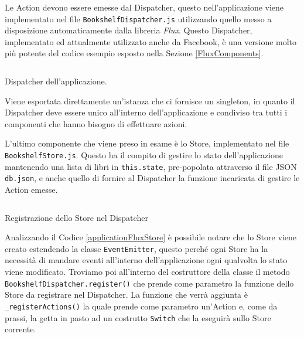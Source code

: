 Le Action devono essere emesse dal Dispatcher, questo nell'applicazione viene implementato nel file \texttt{BookshelfDispatcher.js} utilizzando quello messo a disposizione automaticamente dalla libreria \textit{Flux}. Questo Dispatcher, implementato ed attualmente utilizzato anche da Facebook, è una versione molto più potente del codice esempio esposto nella Sezione \ref{FluxComponents}.

\begin{listing}[ht]
\inputminted{jsx}{sources/applicationFluxDispatcher.js}
\caption{Dispatcher dell'applicazione.} 
\label{applicationFluxDispatcher} 
\end{listing} 

\noindent
Viene esportata direttamente un'istanza che ci fornisce un singleton, in quanto il Dispatcher deve essere unico all'interno dell'applicazione e condiviso tra tutti i componenti che hanno bisogno di effettuare azioni.

L'ultimo componente che viene preso in esame è lo Store, implementato nel file \texttt{BookshelfStore.js}. Questo ha il compito di gestire lo stato dell'applicazione mantenendo una lista di libri in \texttt{this.state}, pre-popolata attraverso il file JSON \texttt{db.json}, e anche quello di fornire al Dispatcher la funzione incaricata di gestire le Action emesse.

\begin{listing}[ht]
\inputminted{jsx}{sources/applicationFluxStore.js}
\caption{Registrazione dello Store nel Dispatcher} 
\label{applicationFluxStore} 
\end{listing}

\noindent
Analizzando il Codice \ref{applicationFluxStore} è possibile notare che lo Store viene creato estendendo la classe \texttt{EventEmitter}, questo perché ogni Store ha la necessità di mandare eventi all'interno dell'applicazione ogni qualvolta lo stato viene modificato. Troviamo poi all'interno del costruttore della classe il metodo \texttt{BookshelfDispatcher.register()} che prende come parametro la funzione dello Store da registrare nel Dispatcher. La funzione che verrà aggiunta è \texttt{_registerActions()} la quale prende come parametro un'Action e, come da prassi, la getta in pasto ad un costrutto \texttt{Switch} che la eseguirà sullo Store corrente.


